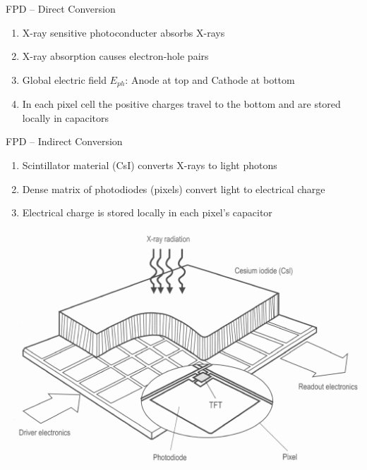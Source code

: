 \begin{frame}[c]{FPD -- Direct Conversion}
    \begin{enumerate}
        \setlength\itemsep{0.3cm}
        \item X-ray sensitive photoconducter absorbs X-rays
        \item X-ray absorption causes electron-hole pairs
        \item Global electric field $E_{ph}$: Anode at top and Cathode at bottom
        \item In each pixel cell the positive charges travel to the bottom and are stored locally in capacitors
    \end{enumerate}
\end{frame}

\begin{frame}{FPD -- Indirect Conversion}
    \begin{enumerate}
        \item Scintillator material (CsI) converts X-rays to light photons
        \item Dense matrix of photodiodes (pixels) convert light to electrical charge
        \item Electrical charge is stored locally in each pixel's capacitor
    \end{enumerate}
    \vspace{-0cm}
    \begin{center}
        \includegraphics[height=0.6\textheight]{images/FlatDetectorSystem}%
    \end{center}
\end{frame}

